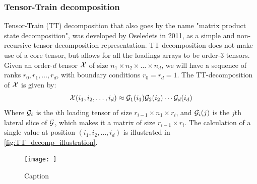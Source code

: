 \subsubsection{Tensor-Train decomposition}
Tensor-Train (TT) decomposition that also goes by the name "matrix product state decomposition", was developed by Oseledets in 2011, as a simple and non-recursive tensor decomposition representation.\cite{Oseledets2011} TT-decomposition does not make use of a core tensor, but allows for all the loadings arrays to be order-3 tensors. Given an order-$d$ tensor $\mathcal{X}$ of size $n_1\times n_2 \times \dots \times n_d$, we will have a sequence of ranks $r_0, r_1, \dots, r_d$, with boundary conditions $r_0=r_d=1$. The TT-decomposition of $\mathcal{X}$ is given by:
\begin{equation}
    \mathcal{X}(i_1, i_2, \dots, i_d) \approx \mathcal{G}_1(i_1) \mathcal{G}_2(i_2) \cdots \mathcal{G}_d(i_d)
\end{equation}
Where $\mathcal{G}_i$ is the $i$th loading tensor of size $r_{i-1}\times n_1\times r_i$, and $\mathcal{G}_i(j)$ is the $j$th lateral slice of $\mathcal{G}$, which makes it a matrix of size $r_{i-1}\times r_i$. The calculation of a single value at position $(i_1, i_2, \dots, i_d)$ is illustrated in \autoref{fig:TT_decomp_illustration}. 
\begin{figure}
    \centering
    \texttt{[image: ]}
    \caption{Caption}
    \label{fig:my_label}
\end{figure}